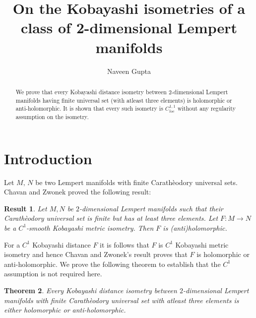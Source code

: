 \documentclass[12pt]{amsart}
\numberwithin{equation}{section}
\newtheorem{theorem}{Theorem}[section]
\newtheorem{result}[theorem]{Result}
\theoremstyle{remark}
\begin{document}
		\title{On the Kobayashi isometries of a class of 2-dimensional Lempert 
			manifolds}
	
	\author[N. Gupta]{Naveen Gupta}
	\address{Department of Mathematics, Netaji Subhas University of Technology,
		Delhi--110 078, India}
	
	
	
	\begin{abstract}
		We prove that every Kobayashi distance isometry between $2$-dimensional 
		Lempert manifolds having finite universal set (with atleast three elements) is 
		holomorphic or anti-holomorphic. It is shown that every such isometry is 
		$C_{loc}^{1,1}$ without any regularity assumption on the isometry. 
	\end{abstract}
	\maketitle
	
	

	
	\section{Introduction}
	
	Let $M,\, N$ be two Lempert manifolds with finite Carath\`{e}odory universal sets. Chavan 
	and Zwonek \cite[~Theorem 2]{cha-zwo} proved the following result:
	\begin{result}\label{res:cha-zwo}
		Let $M,N$ be $2$-dimensional Lempert manifolds such that
		their Carath\`{e}odory universal set is finite but has at least three elements.
		Let $F : M \to N$ be a $C^1$-smooth Kobayashi metric isometry. Then $F$
		is (anti)holomorphic.
	\end{result}

For a $C^1$ Kobayashi distance  $F$ it is follows that $F$ is $C^1$ 
Kobayashi metric isometry and hence Chavan and Zwonek's result proves  that $F$ is holomorphic 
or anti-holomorphic. We prove 
the following theorem to establish that the $C^1$ assumption is not required here.

\begin{theorem}\label{thm:main}
	Every Kobayashi distance isometry between $2$-dimensional Lempert manifolds with 
	finite  Carath\`{e}odory universal set with atleast three elements 
	 is either holomorphic or anti-holomorphic.
\end{theorem}
\end{document}
